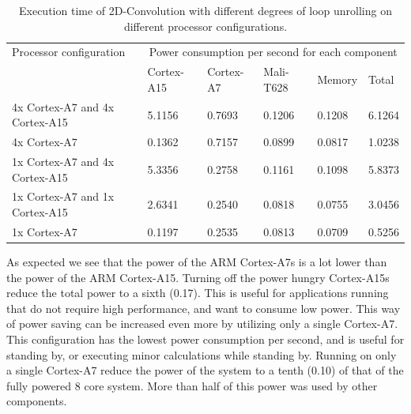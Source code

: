\begin{table}[H]
  \begin{tabular}{llllll}
    \toprule
    Processor configuration         & \multicolumn{5}{c}{Power consumption per second for each component} \\
                                    & Cortex-A15  & Cortex-A7 & Mali-T628 & Memory  & Total \\
    \midrule
    4x Cortex-A7 and 4x Cortex-A15  & 5.1156          & 0.7693        & 0.1206        & 0.1208  & 6.1264 \\
    4x Cortex-A7                    & 0.1362          & 0.7157        & 0.0899        & 0.0817  & 1.0238 \\
    1x Cortex-A7 and 4x Cortex-A15  & 5.3356          & 0.2758        & 0.1161        & 0.1098  & 5.8373 \\
    1x Cortex-A7 and 1x Cortex-A15  & 2.6341          & 0.2540        & 0.0818        & 0.0755  & 3.0456 \\
    1x Cortex-A7                    & 0.1197          & 0.2535        & 0.0813        & 0.0709  & 0.5256 \\
    \bottomrule
  \end{tabular}
  \caption{Execution time of 2D-Convolution with different degrees of loop unrolling on different processor configurations. \label{power-configurations-table}}
\end{table}

As expected we see that the power of the ARM Cortex-A7s is a lot lower than the power of the ARM Cortex-A15.
Turning off the power hungry Cortex-A15s reduce the total power to a sixth (0.17).
This is useful for applications running that do not require high performance, and  want to consume low power.
This way of power saving can be increased even more by utilizing only a single Cortex-A7.
This configuration has the lowest power consumption per second, and is useful for standing by, or executing minor calculations while standing by.
Running on only a single Cortex-A7 reduce the power of the system to a tenth (0.10) of that of the fully powered 8 core system.
More than half of this power was used by other components.

